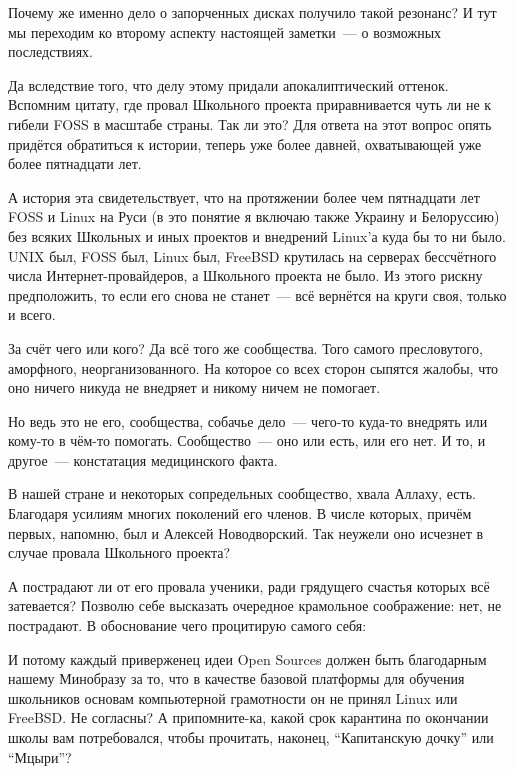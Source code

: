 Почему же именно дело о запорченных дисках получило такой резонанс? И тут мы переходим ко второму аспекту настоящей заметки~--- о возможных последствиях.

Да вследствие того, что делу этому придали апокалиптический оттенок. Вспомним цитату, где провал Школьного проекта приравнивается чуть ли не к гибели FOSS в масштабе страны. Так ли это? Для ответа на этот вопрос опять придётся обратиться к истории, теперь уже более давней, охватывающей уже более пятнадцати лет.

А история эта свидетельствует, что на протяжении более чем пятнадцати лет FOSS и Linux на Руси (в это понятие я включаю также Украину и Белоруссию) без всяких Школьных и иных проектов и внедрений Linux'а куда бы то ни было. UNIX был, FOSS был, Linux был, FreeBSD крутилась на серверах бессчётного числа Интернет-провайдеров, а Школьного проекта не было. Из этого рискну предположить, то если его снова не станет~--- всё вернётся на круги своя, только и всего.

За счёт чего или кого? Да всё того же сообщества. Того самого пресловутого, аморфного, неорганизованного. На которое со всех сторон сыпятся жалобы, что оно ничего никуда не внедряет и никому ничем не помогает.

Но ведь это не его, сообщества, собачье дело~--- чего-то куда-то внедрять или кому-то в чём-то помогать. Сообщество~--- оно или есть, или его нет. И то, и другое~--- констатация медицинского факта.

В нашей стране и некоторых сопредельных сообщество, хвала Аллаху, есть. Благодаря усилиям многих поколений его членов. В числе которых, причём первых, напомню, был и Алексей Новодворский. Так неужели оно исчезнет в случае провала Школьного проекта?

А пострадают ли от его провала ученики, ради грядущего счастья которых всё затевается? Позволю себе высказать очередное крамольное соображение: нет, не пострадают. В обоснование чего процитирую самого себя:


\begin{shadequote}{}
И потому каждый приверженец идеи Open Sources должен быть благодарным нашему Минобразу за то, что в качестве базовой платформы для обучения школьников основам компьютерной грамотности он не принял Linux или FreeBSD. Не согласны? А припомните-ка, какой срок карантина по окончании школы вам потребовался, чтобы прочитать, наконец, ``Капитанскую дочку'' или ``Мцыри''?
\end{shadequote}

